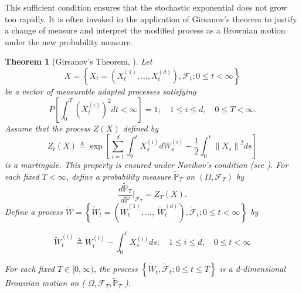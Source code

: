 \documentclass[11pt, twoside]{report}
\newtheorem{theorem}{Theorem}[section]
\begin{document}
This sufficient condition ensures that the stochastic exponential does not grow too rapidly. It is often invoked in the application of Girsanov's theorem to justify a change of measure and interpret the modified process as a Brownian motion under the new probability measure.

\begin{theorem}[Girsanov's Theorem, \texorpdfstring{\cite[Theorem~5.1]{Karatzas1991-xr}}{}]
Let $$X=\left\{X_t=\left(X_t^{(1)}, \ldots, X_t^{(d)}\right), \mathcal{F}_t ; 0 \leq t<\infty\right\}$$ be a vector of measurable adapted processes satisfying
$$
P\left[\int_0^T\left(X_t^{(i)}\right)^2 d t<\infty\right]=1 ; \quad 1 \leq i \leq d, \quad 0 \leq T<\infty.
$$
Assume that the process $Z(X)$ defined by 
$$
Z_t(X) \triangleq \exp \left[\sum_{i=1}^d \int_0^t X_s^{(i)} d W_s^{(i)}-\frac{1}{2} \int_0^t\left\|X_s\right\|^2 d s\right]
$$
is a martingale. This property is ensured under Novikov’s condition (see \cite[Corollary 5.13 of Novikov Condition]{Karatzas1991-xr}). 
For each fixed \(T<\infty\), define a probability measure
\(\tilde{\mathbb P}_T\) on \((\Omega,\mathcal F_T)\) by
\[
\frac{d\tilde{\mathbb P}_T}{d\mathbb P}\bigg|_{\mathcal F_T}
=
Z_T(X).
\]
Define a process $\tilde{W}=\left\{\tilde{W}_t=\left(\tilde{W}_t^{(1)}, \ldots\right.\right.$, $\left.\left.\tilde{W}_t^{(d)}\right), \tilde{\mathcal{F}}_t ; 0 \leq t<\infty\right\}$ by

$$
\tilde{W}_t^{(i)} \triangleq W_t^{(i)}-\int_0^t X_s^{(i)} d s ; \quad 1 \leq i \leq d, \quad 0 \leq t<\infty
$$


For each fixed $T \in[0, \infty)$, the process $\left\{\tilde{W}_t, \tilde{\mathcal{F}}_t ; 0 \leq t \leq T\right\}$ is a d-dimensional Brownian motion on ( $\Omega, \mathcal{F}_T, \tilde{\mathbb{P}}_T$ ).
\end{theorem}

\end{document}
